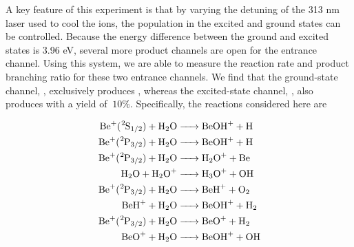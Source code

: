 A key feature of this experiment is that by varying the detuning of the 313 nm laser used to cool the ions, the population in the excited  and ground  states can be controlled. Because the energy difference between the ground and excited states is 3.96 eV, several more product channels are open for the  entrance channel. Using this system, we are able to measure the reaction rate and product branching ratio for these two entrance channels. We find that the ground-state channel, , exclusively produces , whereas the excited-state channel, , also produces  with a yield of $~10\%$. Specifically, the reactions considered here are

\begin{align}
	\ce{Be+(^2S1/2) + H2O & -> BeOH+ + H} \label{r: Be(S)+H2O->BeOH} \\
	\ce{Be+(^2P3/2) + H2O & -> BeOH+ + H} \label{r: Be(P)+H2O->BeOH} \\
	\ce{Be+(^2P3/2) + H2O & -> H2O+ + Be} \label{r: Be(P)+H2O->H2O} \\
	\ce{H2O + H2O+ & -> H3O+ + OH} \label{r: H2O+H2O->H3O} \\
	\ce{Be+(^2P3/2) + H2O & -> BeH+ + O2} \label{r: Be(P)+H2O->BeH} \\
	\ce{BeH+ + H2O & -> BeOH+ + H2} \label{r: BeH+H2O->BeOH} \\
	\ce{Be+(^2P3/2) + H2O & -> BeO+ + H2} \label{r: Be(P)+H2O->BeO} \\
	\ce{BeO+ + H2O & -> BeOH+ + OH} \label{r: BeO+H2O->BeOH}
\end{align}

